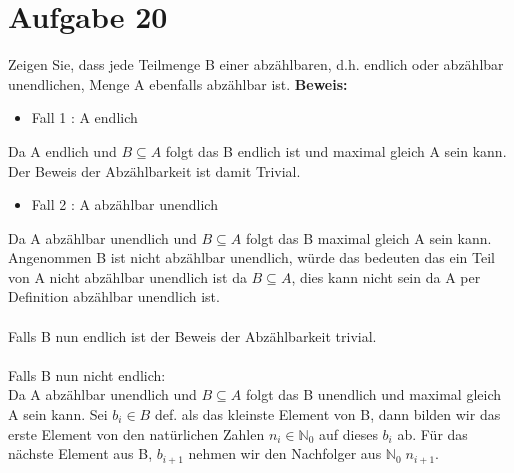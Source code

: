 \documentclass[paper = a4, ngerman]{scrartcl}
\begin{document}
	\section*{Aufgabe 20}
Zeigen Sie, dass jede Teilmenge B einer abzählbaren, d.h. endlich oder abzählbar unendlichen, Menge A ebenfalls abzählbar ist.
\textbf{Beweis:}
\begin{itemize}
	\item Fall 1 : A endlich
\end{itemize}
Da A endlich und $B \subseteq A$  folgt das B endlich ist und maximal gleich A sein kann. Der Beweis der Abzählbarkeit ist damit Trivial.
\begin{itemize}
	\item Fall 2 : A abzählbar unendlich
\end{itemize}
Da A abzählbar unendlich und $B \subseteq A$  folgt das B maximal gleich A sein kann.\\
Angenommen B ist nicht abzählbar unendlich, würde das bedeuten das ein Teil von A nicht abzählbar unendlich ist da $B \subseteq A$, dies kann nicht sein da A per Definition abzählbar unendlich ist.\\\\
Falls B nun endlich ist der Beweis der Abzählbarkeit trivial.\\\\
Falls B nun nicht endlich:\\
Da A abzählbar unendlich und $B \subseteq A$  folgt das B unendlich und maximal gleich A sein kann. Sei $b_i \in B$ def. als das kleinste Element von B, dann bilden wir das erste Element von den natürlichen Zahlen $n_i \in \mathbb{N}_{0}$ auf dieses $b_i$ ab. Für das nächste Element aus B, $b_{i+1}$ nehmen wir den Nachfolger aus $\mathbb{N}_{0}\; n_{i+1}$.	
	

	
	
\end{document}
